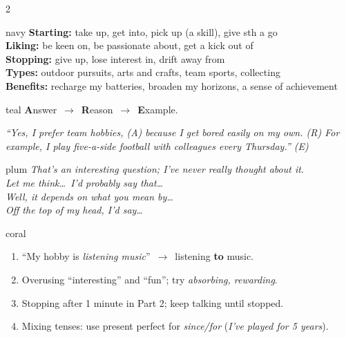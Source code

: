 \documentclass[10pt,a4paper]{article}
\begin{document}
\begin{multicols}{2}
\raggedcolumns
\begin{tipbox}{navy}
\textbf{Starting:} take up, get into, pick up (a skill), give sth a go\\
\textbf{Liking:} be keen on, be passionate about, get a kick out of\\
\textbf{Stopping:} give up, lose interest in, drift away from\\
\textbf{Types:} outdoor pursuits, arts and crafts, team sports, collecting\\
\textbf{Benefits:} recharge my batteries, broaden my horizons, a sense of achievement
\end{tipbox}

\begin{tipbox}{teal}
\textbf{A}nswer \,$\rightarrow$\, \textbf{R}eason \,$\rightarrow$\, \textbf{E}xample.\par
\itshape ``Yes, I prefer team hobbies, \textup{(A)} because I get bored easily on my own. \textup{(R)}
For example, I play five-a-side football with colleagues every Thursday.'' \textup{(E)}
\end{tipbox}

\columnbreak
\begin{tipbox}{plum}
\textit{That's an interesting question; I've never really thought about it.}\\
\textit{Let me think\ldots\ I'd probably say that\ldots}\\
\textit{Well, it depends on what you mean by\ldots}\\
\textit{Off the top of my head, I'd say\ldots}
\end{tipbox}

\begin{tipbox}{coral}
\begin{enumerate}[label=\textbf{\arabic*.},leftmargin=4mm]
  \item ``My hobby is \emph{listening music}'' \,$\rightarrow$\, listening \textbf{to} music.
  \item Overusing ``interesting'' and ``fun''; try \emph{absorbing, rewarding}.
  \item Stopping after 1 minute in Part 2; keep talking until stopped.
  \item Mixing tenses: use present perfect for \emph{since/for} (\emph{I've played for 5 years}).
\end{enumerate}
\end{tipbox}
\end{multicols}
\end{document}
